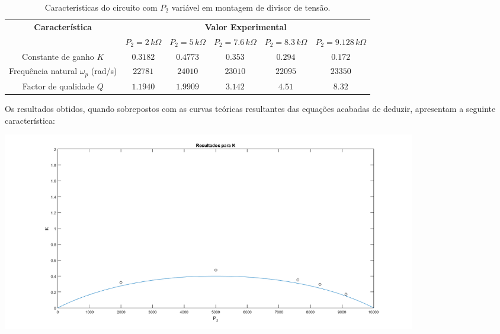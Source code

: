 \documentclass[a4paper,11pt]{report}
\begin{document}
\begin{table}[h]
\centering
\label{my-label}
\begin{tabular}{||c|c|c|c|c|c||}
\hline
\multirow{2}{*}{\textbf{Característica}} & \multicolumn{5}{c||}{\textbf{Valor Experimental}}                                                          \\ \cline{2-6} 
                                         & $P_2=2\, k\Omega$ & $P_2=5\, k\Omega$ & $P_2=7.6\, k\Omega$ & $P_2=8.3\, k\Omega$ & $P_2=9.128\, k\Omega$ \\ \hline\hline
Constante de ganho $K$                   & $0.3182$          & $0.4773$          & $0.353$             & $0.294$             & $0.172$               \\ \hline
Frequência natural $\omega_p$ (rad/s)    & $22781$           & $24010$           & $23010$             & $22095$             & $23350$               \\ \hline
Factor de qualidade $Q$                  & $1.1940$          & $1.9909$          & $3.142$             & $4.51$              & $8.32$                \\ \hline
\end{tabular}
\caption{Características do circuito com $P_2$ variável em montagem de divisor de tensão.}
\end{table}





Os resultados obtidos, quando sobrepostos com as curvas teóricas resultantes das equações acabadas de deduzir, apresentam a seguinte característica:

\begin{center}
     \includegraphics[angle=0,width=0.8\textwidth]{RelacaoKP2KHN.png}
     \label{fig:RelacaoKP2KHN}
     \end{center}
\end{document}
